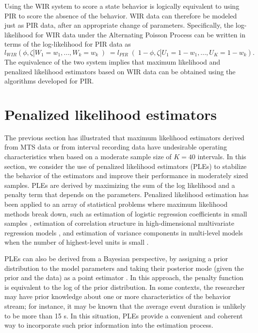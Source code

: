 \documentclass[man, noextraspace, floatsintext]{apa6}\usepackage[]{graphicx}\usepackage[]{color}
\begin{document}
Using the WIR system to score a state behavior is logically equivalent to using PIR to score the absence of the behavior. 
WIR data can therefore be modeled just as PIR data, after an appropriate change of parameters. 
Specifically, the log-likelihood for WIR data under the Alternating Poisson Process can be written in terms of the log-likelihood for PIR data as
\begin{equation}
l_{WIR}\left(\phi, \zeta | W_1 = w_1,...,W_k = w_k \left) = l_{PIR}\right(1 - \phi, \zeta | U_1 = 1 - w_1,...,U_K = 1 - w_k\right).
\end{equation}
The equivalence of the two system implies that maximum likelihood and penalized likelihood estimators based on WIR data can be obtained using the algorithms developed for PIR. 

\section{Penalized likelihood estimators}

The previous section has illustrated that maximum likelihood estimators derived from MTS data or from interval recording data have undesirable operating characteristics when based on a moderate sample size of $K = 40$ intervals. 
In this section, we consider the use of penalized likelihood estimators (PLEs) to stabilize the behavior of the estimators and improve their performance in moderately sized samples. 
PLEs are derived by maximizing the sum of the log likelihood and a penalty term that depends on the parameters. 
Penalized likelihood estimation has been applied to an array of statistical problems where maximum likelihood methods break down, such as estimation of logistic regression coefficients in small samples \citep{Galindo-Garre2004bayesian, Gelman2008weakly}, estimation of correlation structure in high-dimensional multivariate regression models \citep{Warton2008penalized}, and estimation of variance components in multi-level models when the number of highest-level units is small \citep{Chung2012non-degenerate}. 

PLEs can also be derived from a Bayesian perspective, by assigning a prior distribution to the model parameters and taking their posterior mode (given the prior and the data) as a point estimator \citep{Chung2012non-degenerate}. 
In this approach, the penalty function is equivalent to the log of the prior distribution. 
In some contexts, the researcher may have prior knowledge about one or more characteristics of the behavior stream; for instance, it may be known that the average event duration is unlikely to be more than 15 s. 
In this situation, PLEs provide a convenient and coherent way to incorporate such prior information into the estimation process. 
\end{document}
